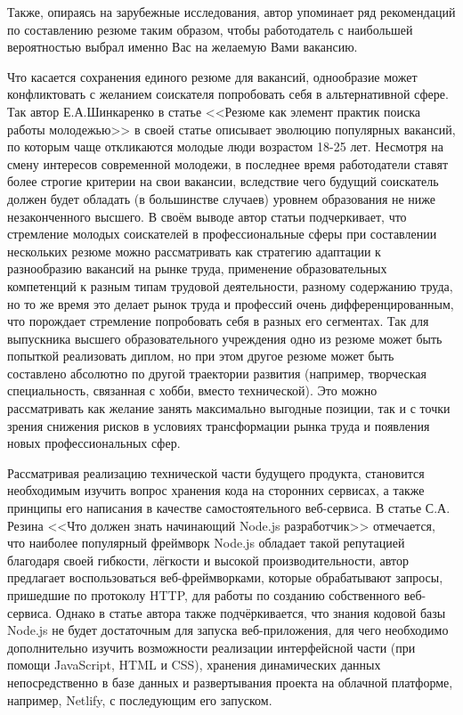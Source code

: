 \documentclass[master, och, diploma]{SCWorks}
\begin{document}
Также, опираясь на зарубежные исследования, автор упоминает ряд рекомендаций по составлению резюме таким образом, чтобы работодатель с наибольшей вероятностью выбрал именно Вас на желаемую Вами вакансию\cite{Kosolapova_2020}.

Что касается сохранения единого резюме для вакансий, однообразие может конфликтовать с желанием соискателя попробовать себя в альтернативной сфере. Так автор Е.А.Шинкаренко в статье <<Резюме как элемент практик поиска работы молодежью>> в своей статье описывает эволюцию популярных вакансий, по которым чаще откликаются молодые люди возрастом 18-25 лет. Несмотря на смену интересов современной молодежи, в последнее время работодатели ставят более строгие критерии на свои вакансии, вследствие чего будущий соискатель должен будет обладать (в большинстве случаев) уровнем образования не ниже незаконченного высшего. В своём выводе автор статьи подчеркивает, что стремление молодых соискателей в профессиональные сферы при составлении нескольких резюме можно рассматривать как стратегию адаптации к разнообразию вакансий на рынке труда, применение образовательных компетенций к разным типам трудовой деятельности, разному содержанию труда, но то же время это делает рынок труда и профессий очень дифференцированным, что порождает стремление попробовать себя в разных его сегментах\cite{Shinkarenko_2022}. Так для выпускника высшего образовательного учреждения одно из резюме может быть попыткой реализовать диплом, но при этом другое резюме может быть составлено абсолютно по другой траектории развития (например, творческая специальность, связанная с хобби, вместо технической). Это можно рассматривать как желание занять максимально выгодные позиции, так и с точки зрения снижения рисков в условиях трансформации рынка труда и появления новых профессиональных сфер\cite{Shinkarenko_2021}.

Рассматривая реализацию технической части будущего продукта, становится необходимым изучить вопрос хранения кода на сторонних сервисах, а также принципы его написания в качестве самостоятельного веб-сервиса. В статье С.А. Резина <<Что должен знать начинающий Node.js разработчик>> отмечается, что наиболее популярный фреймворк Node.js обладает такой репутацией благодаря своей гибкости, лёгкости и высокой производительности, автор предлагает воспользоваться веб-фреймворками, которые обрабатывают запросы, пришедшие по протоколу HTTP, для работы по созданию собственного веб-сервиса\cite{Razin_2020}. Однако в статье автора также подчёркивается, что знания кодовой базы Node.js не будет достаточным для запуска веб-приложения, для чего необходимо дополнительно изучить возможности реализации интерфейсной части (при помощи JavaScript, HTML и CSS), хранения динамических данных непосредственно в базе данных и развертывания проекта на облачной платформе, например, Netlify, с последующим его запуском\cite{Holms_2017}.
\end{document}
